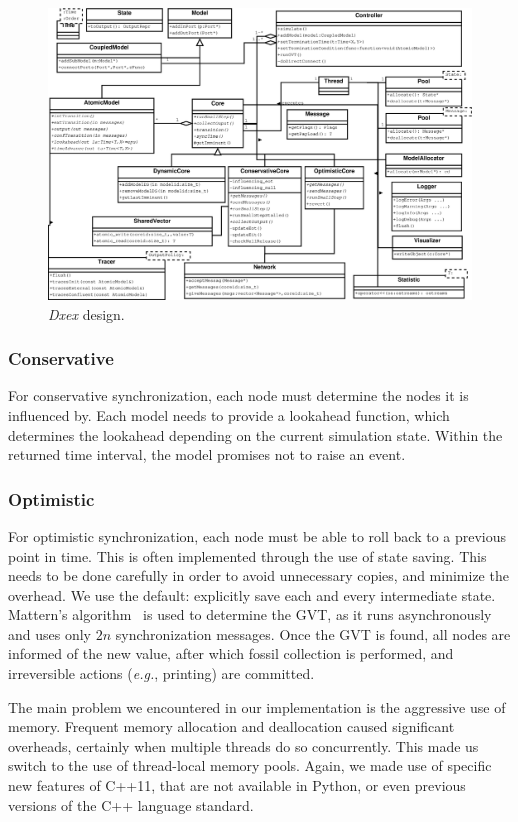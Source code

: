 \begin{figure}
    \includegraphics[width=\textwidth]{fig/cores_class_diagram.eps}
	\caption{\textit{Dxex} design.}
	\label{fig:class_diagram}
\end{figure}

\subsubsection{Conservative}
For conservative synchronization, each node must determine the nodes it is influenced by.
Each model needs to provide a lookahead function, which determines the lookahead depending on the current simulation state.
Within the returned time interval, the model promises not to raise an event.

\subsubsection{Optimistic}
For optimistic synchronization, each node must be able to roll back to a previous point in time.
This is often implemented through the use of state saving.
This needs to be done carefully in order to avoid unnecessary copies, and minimize the overhead.
We use the default: explicitly save each and every intermediate state.
Mattern's algorithm~\cite{mattern} is used to determine the GVT, as it runs asynchronously and uses only $2n$ synchronization messages.
Once the GVT is found, all nodes are informed of the new value, after which fossil collection is performed, and irreversible actions (\textit{e.g.}, printing) are committed.

The main problem we encountered in our implementation is the aggressive use of memory.
Frequent memory allocation and deallocation caused significant overheads, certainly when multiple threads do so concurrently.
This made us switch to the use of thread-local %
 memory pools.
Again, we made use of specific new features of C++11, that are not available in Python, or even previous versions of the C++ language standard.

